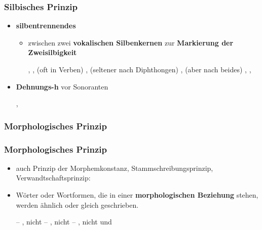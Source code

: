 \begin{frame}
\frametitle{Silbisches Prinzip}

\begin{itemize}
	\item \textbf{silbentrennendes }
	
	\begin{itemize}
	\item zwischen zwei \textbf{vokalischen Silbenkernen} \ras zur \textbf{Markierung der Zweisilbigkeit}
	
	
	\eal
	\ex {}, , 
	\ex (oft in Verben) , 
	\ex (seltener nach Diphthongen) , 
	\ex (aber nach  beides) , , 
	\zl
	
	\end{itemize}

\pause 

	\item \textbf{Dehnungs-h} vor Sonoranten
	
	\ea	{}, 
	\z

\end{itemize}

\end{frame}


\subsubsection{Morphologisches Prinzip}


\begin{frame}
\frametitle{Morphologisches Prinzip}

\begin{itemize}
	\item auch Prinzip der Morphemkonstanz, Stammschreibungsprinzip, Verwandtschaftsprinzip:
	
	\item Wörter oder Wortformen, die in einer \textbf{morphologischen Beziehung} stehen, werden ähnlich oder gleich geschrieben.
	
	\eal
	\ex {} -- , nicht 
	\ex {} -- , nicht 
	\ex {} -- , nicht  und 
	\zl

\end{itemize}

\end{frame}


